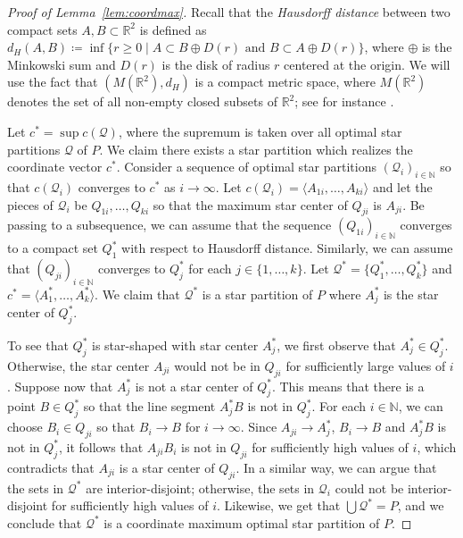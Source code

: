 \documentclass[10pt,a4paper]{article}
\newcommand{\RR}{\mathbb{R}}
\newcommand{\NN}{\mathbb{N}}
\begin{document}
\begin{proof}[Proof of Lemma~\ref{lem:coordmax}]
Recall that the \emph{Hausdorff distance} between two compact sets $A,B \subset \RR^2$ is defined as $d_H(A,B) \coloneqq \inf \{ r \geq 0 \mid A \subset B \oplus D(r) \text{ and } B \subset A \oplus D(r) \}$,
where $\oplus$ is the Minkowski sum and $D(r)$ is the disk of radius $r$ centered at the origin.
We will use the fact that $(M(\RR^2), d_H)$ is a compact metric space, where $M(\RR^2)$ denotes the set of all non-empty closed subsets of $\RR^2$; see for instance \cite[Theorem~4.5]{evans_probability_2008}.

Let $c^*=\sup c(\mathcal Q)$, where the supremum is taken over all optimal star partitions $\mathcal Q$ of $P$.
We claim there exists a star partition which realizes the coordinate vector $c^*$.
Consider a sequence of optimal star partitions $(\mathcal Q_i)_{i\in\NN}$ so that $c(\mathcal Q_i)$ converges to $c^*$ as $i\longrightarrow\infty$.
Let $c(\mathcal Q_i)=\langle A_{1i},\ldots,A_{ki}\rangle$ and let the pieces of $\mathcal Q_i$ be $Q_{1i},\ldots,Q_{ki}$ so that the maximum star center of $Q_{ji}$ is $A_{ji}$.
Be passing to a subsequence, we can assume that the sequence $(Q_{1i})_{i\in\NN}$ converges to a compact set $Q_1^*$ with respect to Hausdorff distance.
Similarly, we can assume that $(Q_{ji})_{i\in\NN}$ converges to $Q_j^*$ for each $j\in\{1,\ldots,k\}$.
Let $\mathcal Q^*=\{Q_1^*,\ldots,Q_k^*\}$ and $c^*=\langle A_1^*,\ldots,A_k^*\rangle$.
We claim that $\mathcal Q^*$ is a star partition of $P$ where $A_j^*$ is the star center of $Q_j^*$.

To see that $Q_j^*$ is star-shaped with star center $A_j^*$, we first observe that $A_j^*\in Q_j^*$.
Otherwise, the star center $A_{ji}$ would not be in $Q_{ji}$ for sufficiently large values of $i$.
Suppose now that $A_j^*$ is not a star center of $Q_j^*$.
This means that there is a point $B\in Q_j^*$ so that the line segment $A_j^*B$ is not in $Q_j^*$.
For each $i\in\NN$, we can choose $B_i\in Q_{ji}$ so that $B_i\longrightarrow B$ for $i\longrightarrow\infty$.
Since $A_{ji}\longrightarrow A_j^*$, $B_i\longrightarrow B$ and $A_j^*B$ is not in $Q_j^*$, it follows that $A_{ji}B_i$ is not in $Q_{ji}$ for sufficiently high values of $i$, which contradicts that $A_{ji}$ is a star center of $Q_{ji}$.
In a similar way, we can argue that the sets in $\mathcal Q^*$ are interior-disjoint; otherwise, the sets in $\mathcal Q_i$ could not be interior-disjoint for sufficiently high values of $i$.
Likewise, we get that $\bigcup \mathcal Q^*=P$, and we conclude that $\mathcal Q^*$ is a coordinate maximum optimal star partition of $P$.
\end{proof}
\end{document}
